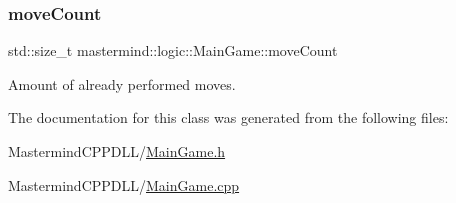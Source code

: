 \subsubsection{\texorpdfstring{move\+Count}{moveCount}}
{\footnotesize\ttfamily std\+::size\+\_\+t mastermind\+::logic\+::\+Main\+Game\+::move\+Count\hspace{0.3cm}{\ttfamily [private]}}



Amount of already performed moves. 



The documentation for this class was generated from the following files\+:\begin{DoxyCompactItemize}
\item 
Mastermind\+C\+P\+P\+D\+L\+L/\hyperlink{_main_game_8h}{Main\+Game.\+h}\item 
Mastermind\+C\+P\+P\+D\+L\+L/\hyperlink{_main_game_8cpp}{Main\+Game.\+cpp}\end{DoxyCompactItemize}
